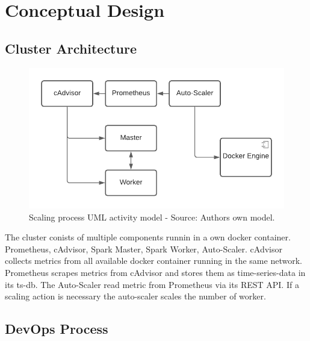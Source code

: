 \chapter{Conceptual Design}
\label{sec:design}
%


\section{Cluster Architecture}

\begin{figure}[h]%
\centering
\includegraphics[scale=0.8]{images/04_conceptual_design/cluster_architecture/overall_architecture}%
\caption{Scaling process UML activity model - Source: Authors own model.}%
\label{fig:ca-overall_architecture}%
\end{figure}

The cluster conists of multiple components runnin in a own docker container. Prometheus, cAdvisor, Spark Master, Spark Worker, Auto-Scaler.
cAdvisor collects metrics from all available docker container running in the same network. Prometheus scrapes metrics from cAdvisor and stores them as time-series-data in its ts-db. The Auto-Scaler read metric from Prometheus via its REST API. If a scaling action is necessary the auto-scaler scales the number of worker.
% 


\section{DevOps Process}


